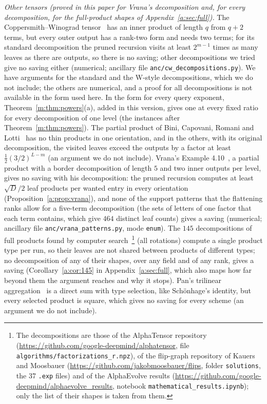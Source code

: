 \documentclass[11pt]{article}
\theoremstyle{definition}
\theoremstyle{remark}
\begin{document}
\emph{Other tensors (proved in this paper for Vrana's decomposition and, for every decomposition, for the full-product shapes of Appendix~\ref{a:sec:full}).} The Coppersmith--Winograd tensor~\cite{CW90} has an inner product of length $q$ from $q+2$ terms, but every outer output has a rank-two form and needs two terms; for its standard decomposition the pruned recursion visits at least $2^{m-1}$ times as many leaves as there are outputs, so there is no saving; other decompositions we tried give no saving either (numerical; ancillary file \texttt{anc/cw\_decompositions.py}). We have arguments for the standard and the W-style decompositions, which we do not include; the others are numerical, and a proof for all decompositions is not available in the form used here.
In the form for every query exponent, Theorem~\ref{m:thm:powers}(a), added in this version, gives one at every fixed ratio for every decomposition of one level (the instances after Theorem~\ref{m:thm:powers}). The partial product of Bini, Capovani, Romani and Lotti~\cite{BCRL79} has no thin products in one orientation, and in the others, with its original decomposition, the visited leaves exceed the outputs by a factor at least $\frac12(3/2)^{L-m}$ (an argument we do not include). Vrana's Example 4.10~\cite{Vra24}, a partial product with a border decomposition of length $5$ and two inner outputs per level, gives no saving with his decomposition: the pruned recursion computes at least $\sqrt D/2$ leaf products per wanted entry in every orientation (Proposition~\ref{a:prop:vrana}), and none of the support patterns that the flattening ranks allow for a five-term decomposition (the sets of letters of one factor that each term contains, which give $464$ distinct leaf counts) gives a saving (numerical; ancillary file \texttt{anc/vrana\_patterns.py}, mode \texttt{enum}). The $145$ decompositions of full products found by computer search~\cite{FBH+22,KM23,Nov25}\footnote{The decompositions are those of the AlphaTensor repository (\url{https://github.com/google-deepmind/alphatensor}, file \texttt{algorithms/factorizations\_r.npz}), of the flip-graph repository of Kauers and Moosbauer (\url{https://github.com/jakobmoosbauer/flips}, folder \texttt{solutions}, the 37 \texttt{.exp} files) and of the AlphaEvolve results (\url{https://github.com/google-deepmind/alphaevolve_results}, notebook \texttt{mathematical\_results.ipynb}); only the list of their shapes is taken from them.} (all rotations) compute a single product type per run, so their leaves are not shared between products of different types; no decomposition of any of their shapes, over any field and of any rank, gives a saving (Corollary~\ref{a:cor:145} in Appendix~\ref{a:sec:full}, which also maps how far beyond them the argument reaches and why it stops). Pan's trilinear aggregation~\cite{Pan78} is a direct sum with type selection, like Schönhage's identity, but every selected product is square, which gives no saving for every scheme (an argument we do not include).
\end{document}

